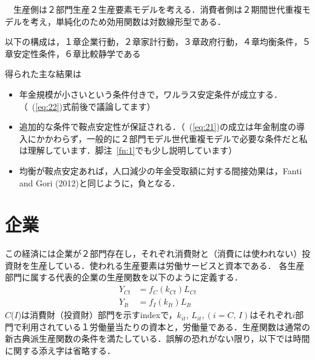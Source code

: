 \documentclass[12pt,a4paper]{jsarticle}
\begin{document}
　生産側は２部門生産２生産要素モデルを考える．消費者側は２期間世代重複モデルを考え，単純化のため効用関数は対数線形型である．

以下の構成は，１章企業行動，２章家計行動，３章政府行動，４章均衡条件，５章安定性条件，６章比較静学である

得られた主な結果は
\begin{itemize}
 \item 年金規模が小さいという条件付きで，ワルラス安定条件が成立する．（~(\ref{eq:22})式前後で議論してます）
 \item 追加的な条件で鞍点安定性が保証される．（~(\ref{eq:21})の成立は年金制度の導入にかかわらず，一般的に２部門モデル世代重複モデルで必要な条件だと私は理解しています．脚注~\ref{fn:1}でも少し説明しています）
 \item 均衡が鞍点安定あれば，人口減少の年金受取額に対する間接効果は，Fanti and Gori (2012)と同じように，負となる．
\end{itemize}

\section{企業}
この経済には企業が２部門存在し，それぞれ消費財と（消費には使われない）投資財を生産している．使われる生産要素は労働サービスと資本である．
各生産部門に属する代表的企業の生産関数を以下のように定義する．
\begin{align}
 Y_{Ct} &= f_{C}(k_{Ct}) L_{Ct}  \\
 Y_{It} &= f_{I}(k_{It}) L_{It}
\end{align}
$C$($I$)は消費財（投資財）部門を示すindexで，$k_{it}, \, L_{it}, (i=C, \, I)$はそれぞれ$i$部門で利用されている１労働量当たりの資本と，労働量である．生産関数は通常の新古典派生産関数の条件を満たしている．誤解の恐れがない限り，以下では時間に関する添え字は省略する．
%
\end{document}
